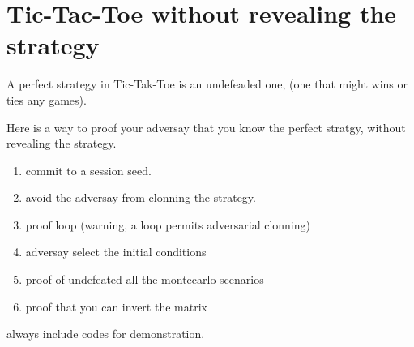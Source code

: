 \chapter{Tic-Tac-Toe without revealing the strategy}

A perfect strategy in Tic-Tak-Toe is an undefeaded one, (one that might wins or ties any games). 

Here is a way to proof your adversay that you know the perfect stratgy, without 
revealing the strategy. 

\begin{enumerate}
    \item commit to a session seed. 
    \item avoid the adversay from clonning the strategy. 
    \item proof loop (warning, a loop permits adversarial clonning)
        \item adversay select the initial conditions
        \item proof of undefeated all the montecarlo scenarios
        \item proof that you can invert the matrix
\end{enumerate}

always include codes for demonstration. 
